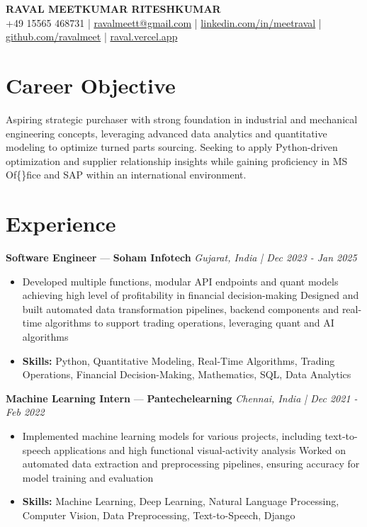 \documentclass[a4paper,10pt]{article}
\begin{document}
\begin{center}
  {\Large\bfseries RAVAL MEETKUMAR RITESHKUMAR}\\[2pt]
  {\small +49 15565 468731 \;|\; \href{mailto:ravalmeett@gmail.com}{ravalmeett@gmail.com} \;|\; \href{https://www.linkedin.com/in/meetraval/}{linkedin.com/in/meetraval} \;|\; \href{https://github.com/ravalmeet}{github.com/ravalmeet} \;|\; \href{https://raval.vercel.app/}{raval.vercel.app}}
\end{center}
\vspace{-3pt}

\section*{Career Objective}
Aspiring strategic purchaser with strong foundation in industrial and mechanical engineering concepts, leveraging advanced data analytics and quantitative modeling to optimize turned parts sourcing. Seeking to apply Python-driven optimization and supplier relationship insights while gaining proficiency in MS Of\{\}fice and SAP within an international environment.\par

\section*{Experience}
\textbf{Software Engineer} — \textbf{Soham Infotech} \hfill \textit{Gujarat, India \;|\; Dec 2023 - Jan 2025}\par
\vspace{1pt}
\begin{itemize}
  \item Developed multiple functions, modular API endpoints and quant models achieving high level of profitability in financial decision-making Designed and built automated data transformation pipelines, backend components and real-time algorithms to support trading operations, leveraging quant and AI algorithms
  \item \textbf{Skills:} Python, Quantitative Modeling, Real-Time Algorithms, Trading Operations, Financial Decision-Making, Mathematics, SQL, Data Analytics
\end{itemize}
\vspace{3pt}
\textbf{Machine Learning Intern} — \textbf{Pantechelearning} \hfill \textit{Chennai, India \;|\; Dec 2021 - Feb 2022}\par
\vspace{1pt}
\begin{itemize}
  \item Implemented machine learning models for various projects, including text-to-speech applications and high functional visual-activity analysis Worked on automated data extraction and preprocessing pipelines, ensuring accuracy for model training and evaluation
  \item \textbf{Skills:} Machine Learning, Deep Learning, Natural Language Processing, Computer Vision, Data Preprocessing, Text-to-Speech, Django
\end{itemize}
\end{document}

